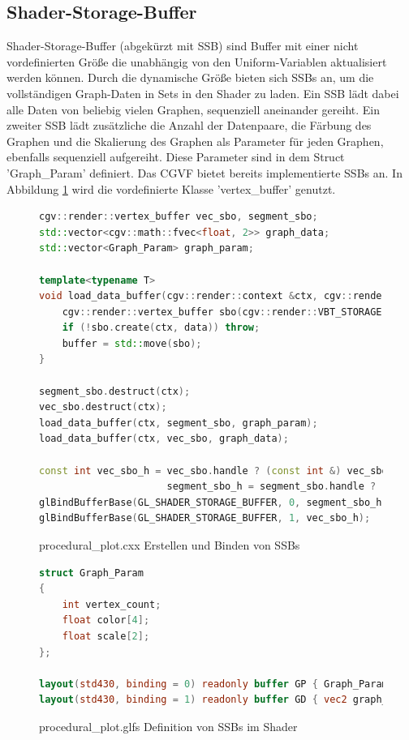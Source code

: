 \subsection{Shader-Storage-Buffer}
Shader-Storage-Buffer (abgekürzt mit SSB) sind Buffer mit einer nicht vordefinierten Größe die unabhängig von den Uniform-Variablen aktualisiert werden können.
Durch die dynamische Größe bieten sich SSBs an, um die vollständigen Graph-Daten in Sets in den Shader zu laden.
Ein SSB lädt dabei alle Daten von beliebig vielen Graphen, sequenziell aneinander gereiht.
Ein zweiter SSB lädt zusätzliche die Anzahl der Datenpaare, die Färbung des  Graphen und die Skalierung des Graphen als Parameter für jeden Graphen, ebenfalls sequenziell aufgereiht.
Diese Parameter sind in dem Struct 'Graph\_Param' definiert.
Das CGVF bietet bereits implementierte SSBs an.
In Abbildung \ref{fig:code_sb1} wird die vordefinierte Klasse 'vertex\_buffer' genutzt.
\begin{figure}[ht]
	\begin{lstlisting}[language=C++]
cgv::render::vertex_buffer vec_sbo, segment_sbo;
std::vector<cgv::math::fvec<float, 2>> graph_data;
std::vector<Graph_Param> graph_param;

template<typename T>
void load_data_buffer(cgv::render::context &ctx, cgv::render::vertex_buffer &buffer, T &data) {
    cgv::render::vertex_buffer sbo(cgv::render::VBT_STORAGE, cgv::render::VBU_STATIC_READ);
    if (!sbo.create(ctx, data)) throw;
    buffer = std::move(sbo);
}

segment_sbo.destruct(ctx);
vec_sbo.destruct(ctx);
load_data_buffer(ctx, segment_sbo, graph_param);
load_data_buffer(ctx, vec_sbo, graph_data);

const int vec_sbo_h = vec_sbo.handle ? (const int &) vec_sbo.handle - 1 : 0,
                      segment_sbo_h = segment_sbo.handle ? (const int &) segment_sbo.handle - 1 : 0;
glBindBufferBase(GL_SHADER_STORAGE_BUFFER, 0, segment_sbo_h);
glBindBufferBase(GL_SHADER_STORAGE_BUFFER, 1, vec_sbo_h);
	\end{lstlisting}
	\caption{procedural\_plot.cxx Erstellen und Binden von SSBs}
	\label{fig:code_sb1}
\end{figure}
\begin{figure}[ht]
	\begin{lstlisting}[language=GLSL]
struct Graph_Param
{
	int vertex_count;
	float color[4];
	float scale[2];
};

layout(std430, binding = 0) readonly buffer GP { Graph_Param graph_param[]; };
layout(std430, binding = 1) readonly buffer GD { vec2 graph_data[]; };
	\end{lstlisting}
	\caption{procedural\_plot.glfs Definition von SSBs im Shader}
	\label{fig:code_sb2}
\end{figure}
\FloatBarrier


